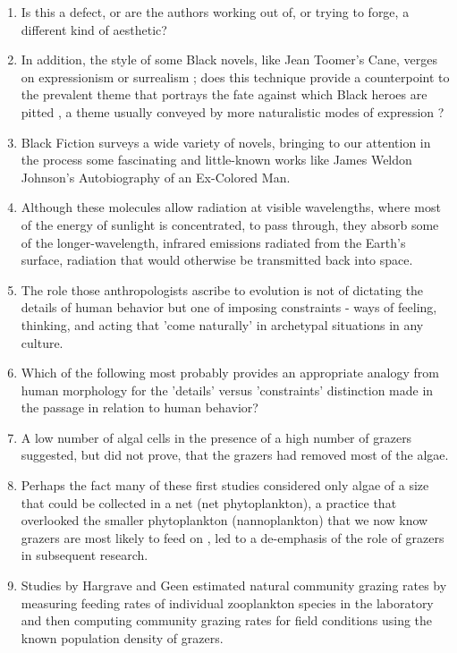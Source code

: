 \begin{enumerate}
\item  Is this a defect, or are the authors working out of, or trying to forge, a different kind of aesthetic?  

\item In addition, the style of some Black novels, like Jean Toomer's Cane, verges on expressionism or surrealism ; does this technique provide a counterpoint to the prevalent theme that portrays the fate against which Black heroes are pitted , a theme usually conveyed by more naturalistic modes of expression ?   

\item Black Fiction surveys a wide variety of novels, bringing to our attention in the process some fascinating and little-known works like James Weldon  Johnson's Autobiography of an Ex-Colored Man. 

\item Although these molecules allow radiation at visible wavelengths,  where most of the energy of sunlight is concentrated, to pass through, they absorb some of the longer-wavelength,   infrared emissions radiated from the Earth's surface, radiation that would otherwise be transmitted back into space. 

\item The role those anthropologists ascribe to evolution is not of dictating the details of human behavior but one of imposing constraints - ways of  feeling, thinking, and acting that  'come naturally' in archetypal situations in any culture. 

\item Which of the following most probably provides an appropriate analogy from human morphology for the 'details' versus 'constraints' distinction made in the passage in relation to human behavior?   

\item A low number of algal cells in the presence of a high number of grazers suggested, but did not prove,  that the grazers had removed most of
the algae. 

\item Perhaps the fact many of these first studies considered only algae of a size that could be collected in a net (net phytoplankton), a practice that overlooked the smaller phytoplankton (nannoplankton) that we now know grazers are most likely to feed on , led to a de-emphasis of the role of grazers in subsequent research. 

\item Studies by Hargrave and Geen estimated natural community grazing rates by measuring feeding rates of individual zooplankton species in the  laboratory and then computing community grazing rates for field conditions  using the known population density of grazers.


\end{enumerate}
